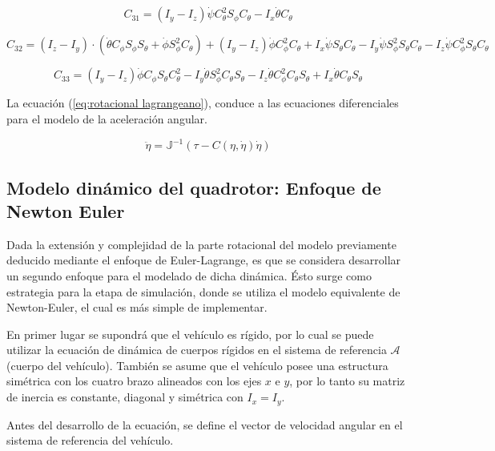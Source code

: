 \documentclass[../main.tex]{subfiles}
\begin{document}
\begin{equation}
C_{31}=(I_{y}-I_{z})\dot{\psi}C_{\theta}^{2}S_{\phi}C_{\theta}-I_{x}\dot{\theta}C_{\theta}
\end{equation}

\begin{equation}
C_{32}=(I_{z}-I_{y})\cdot(\dot{\theta}C_{\phi}S_{\phi}S_{\theta}+\dot{\phi}S_{\phi}^{2}C_{\theta})+(I_{y}-I_{z})\dot{\phi}C_{\phi}^{2}C_{\theta}+I_{x}\dot{\psi}S_{\theta}C_{\theta}-I_{y}\dot{\psi}S_{\phi}^{2}S_{\theta}C_{\theta}-I_{z}\dot{\psi}C_{\phi}^{2}S_{\theta}C_{\theta}
\end{equation}

\begin{equation}
C_{33}=(I_{y}-I_{z})\dot{\phi}C_{\phi}S_{\theta}C_{\theta}^{2}-I_{y}\dot{\theta}S_{\phi}^{2}C_{\theta}S_{\theta}-I_{z}\dot{\theta}C_{\phi}^{2}C_{\theta}S_{\theta}+I_{x}\dot{\theta}C_{\theta}S_{\theta}
\end{equation}

La ecuación (\ref{eq:rotacional lagrangeano}), conduce a las ecuaciones
diferenciales para el modelo de la aceleración angular.

\begin{equation}
\ddot{\eta}=\mathbb{J}^{-1}(\tau-C(\eta,\dot{\eta})\dot{\eta})
\end{equation}

\subsection{Modelo dinámico del quadrotor: Enfoque de Newton Euler}

Dada la extensión y complejidad de la parte rotacional del modelo
previamente deducido mediante el enfoque de Euler-Lagrange, es que
se considera desarrollar un segundo enfoque para el modelado de dicha
dinámica. Ésto surge como estrategia para la etapa de simulación,
donde se utiliza el modelo equivalente de Newton-Euler, el cual es
más simple de implementar. 

En primer lugar se supondrá que el vehículo es rígido, por lo cual
se puede utilizar la ecuación de dinámica de cuerpos rígidos en el
sistema de referencia $\mathcal{A}$ (cuerpo del vehículo). También
se asume que el vehículo posee una estructura simétrica con los cuatro
brazo alineados con los ejes $x$ e $y$, por lo tanto su matriz de
inercia es constante, diagonal y simétrica con $I_{x}=I_{y}$.

Antes del desarrollo de la ecuación, se define el vector de velocidad
angular en el sistema de referencia del vehículo.
\end{document}
